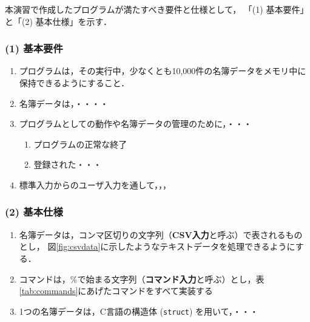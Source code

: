 本演習で作成したプログラムが満たすべき要件と仕様として，
「(1) 基本要件」と「(2) 基本仕様」を示す．

\subsubsection*{(1) 基本要件}

\begin{enumerate}
  \setlength{\parskip}{0em} \setlength{\itemsep}{0.25em}  %
    \item プログラムは，その実行中，少なくとも10,000件の名簿データをメモリ中に保持できるようにすること．
    \item 名簿データは，・・・・
    \item プログラムとしての動作や名簿データの管理のために，・・・
    \begin{enumerate} \setlength{\parskip}{0em} \setlength{\itemsep}{0.25em}
        \item プログラムの正常な終了
        \item 登録された・・・
    \end{enumerate}
    \item 標準入力からのユーザ入力を通して，，，      %
\end{enumerate}

\subsubsection*{(2) 基本仕様}

\begin{enumerate}
  \setlength{\parskip}{0em} \setlength{\itemsep}{0.25em}  %
    \item 名簿データは，コンマ区切りの文字列（\textbf{CSV入力}と呼ぶ）で表されるものとし，%
          図\ref{fig:csvdata}に示したようなテキストデータを処理できるようにする．%
    \item コマンドは，\%で始まる文字列（\textbf{コマンド入力}と呼ぶ）とし，表\ref{tab:commands}にあげたコマンドをすべて実装する
    \item 1つの名簿データは，C言語の構造体 (\texttt{struct}) を用いて，・・・   %
\end{enumerate}

